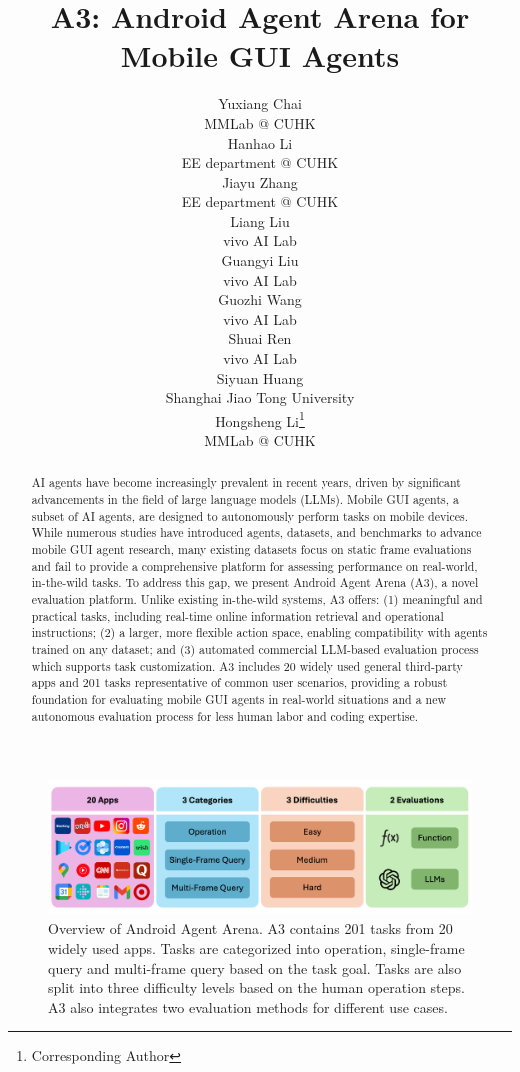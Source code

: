 \documentclass[11pt]{article}
\title{A3: Android Agent Arena for Mobile GUI Agents}
\author{Yuxiang Chai \\
  MMLab @ CUHK \\
  \And
  Hanhao Li \\
  EE department @ CUHK \\
  \And
  Jiayu Zhang \\
  EE department @ CUHK \\
  \AND
  Liang Liu \\
  vivo AI Lab \\
  \And
  Guangyi Liu \\
  vivo AI Lab \\
  \And
  Guozhi Wang \\
  vivo AI Lab \\
  \AND
  Shuai Ren \\
  vivo AI Lab \\
  \And
  Siyuan Huang \\
  Shanghai Jiao Tong University \\
  \And
  Hongsheng Li\thanks{Corresponding Author} \\
  MMLab @ CUHK }
\begin{document}
\maketitle
\begin{abstract}
AI agents have become increasingly prevalent in recent years, driven by significant advancements in the field of large language models (LLMs). Mobile GUI agents, a subset of AI agents, are designed to autonomously perform tasks on mobile devices. While numerous studies have introduced agents, datasets, and benchmarks to advance mobile GUI agent research, many existing datasets focus on static frame evaluations and fail to provide a comprehensive platform for assessing performance on real-world, in-the-wild tasks. To address this gap, we present Android Agent Arena (A3), a novel evaluation platform. Unlike existing in-the-wild systems, A3 offers: (1) meaningful and practical tasks, including real-time online information retrieval and operational instructions; (2) a larger, more flexible action space, enabling compatibility with agents trained on any dataset; and (3) automated commercial LLM-based evaluation process which supports task customization. A3 includes 20 widely used general third-party apps and 201 tasks representative of common user scenarios, providing a robust foundation for evaluating mobile GUI agents in real-world situations and a new autonomous evaluation process for less human labor and coding expertise.
\end{abstract}


\begin{figure}
    \centering
    \includegraphics[width=0.96\linewidth]{images/overview.png}
    \caption{Overview of Android Agent Arena. A3 contains 201 tasks from 20 widely used apps. Tasks are categorized into operation, single-frame query and multi-frame query based on the task goal. Tasks are also split into three difficulty levels based on the human operation steps. A3 also integrates two evaluation methods for different use cases.}
    \label{fig:overview}
\end{figure}
\end{document}
